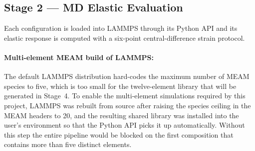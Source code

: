 \subsection{Stage 2 --- MD Elastic Evaluation}
\label{sec:stage2}

Each configuration is loaded into LAMMPS \citep{thompson2022} through its
Python API and its elastic response is computed with a six-point
central-difference strain protocol.

\paragraph{Multi-element MEAM build of LAMMPS:}
The default LAMMPS distribution hard-codes the maximum number of MEAM
species to five, which is too small for the twelve-element library that will be
generated in Stage~4. To enable the multi-element simulations required by
this project, LAMMPS was rebuilt from source after raising the species
ceiling in the MEAM headers to 20, and the resulting shared library
was installed into the user's environment so that the Python API picks
it up automatically. Without this step the entire
pipeline would be blocked on the first composition that contains more
than five distinct elements.

